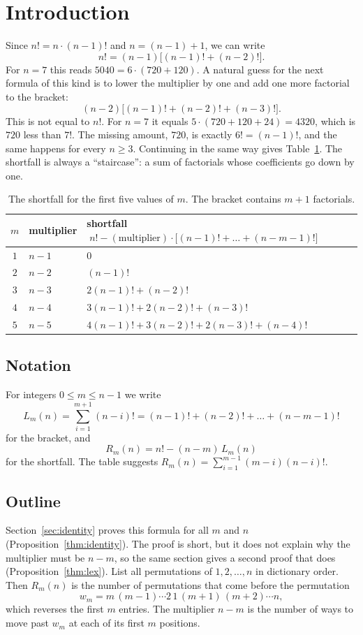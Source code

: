 \documentclass[11pt]{amsart}
\theoremstyle{plain}
\theoremstyle{definition}
\theoremstyle{remark}
\begin{document}
\section{Introduction}\label{sec:intro}

Since $n!=n\cdot(n-1)!$ and $n=(n-1)+1$, we can write
\begin{equation}\label{eq:first}
  n!=(n-1)\bigl[(n-1)!+(n-2)!\bigr].
\end{equation}
For $n=7$ this reads $5040=6\cdot(720+120)$. A natural guess for the next
formula of this kind is to lower the multiplier by one and add one more
factorial to the bracket:
\[
  (n-2)\bigl[(n-1)!+(n-2)!+(n-3)!\bigr].
\]
This is not equal to $n!$. For $n=7$ it equals $5\cdot(720+120+24)=4320$, which
is $720$ less than $7!$. The missing amount, $720$, is exactly $6!=(n-1)!$, and
the same happens for every $n\ge3$. Continuing in the same way gives
Table~\ref{tab:staircase}. The shortfall is always a ``staircase'': a sum of
factorials whose coefficients go down by one.

\begin{table}[!ht]
\centering
\begin{tabular}{@{}cll@{}}
\toprule
$m$ & multiplier & shortfall $\;n!-(\text{multiplier})\cdot\bigl[(n-1)!+\dots+(n-m-1)!\bigr]$\\
\midrule
$1$ & $n-1$ & $0$\\
$2$ & $n-2$ & $(n-1)!$\\
$3$ & $n-3$ & $2(n-1)!+(n-2)!$\\
$4$ & $n-4$ & $3(n-1)!+2(n-2)!+(n-3)!$\\
$5$ & $n-5$ & $4(n-1)!+3(n-2)!+2(n-3)!+(n-4)!$\\
\bottomrule
\end{tabular}
\caption{The shortfall for the first five values of $m$. The bracket contains
$m+1$ factorials.}
\label{tab:staircase}
\end{table}

\subsection*{Notation}
For integers $0\le m\le n-1$ we write
\[
  L_m(n)=\sum_{i=1}^{m+1}(n-i)!=(n-1)!+(n-2)!+\dots+(n-m-1)!
\]
for the bracket, and
\[
  R_m(n)=n!-(n-m)\,L_m(n)
\]
for the shortfall. The table suggests
$R_m(n)=\sum_{i=1}^{m-1}(m-i)(n-i)!$.

\subsection*{Outline}
Section~\ref{sec:identity} proves this formula for all $m$ and $n$
(Proposition~\ref{thm:identity}). The proof is short, but it does not explain why
the multiplier must be $n-m$, so the same section gives a second proof that
does (Proposition~\ref{thm:lex}). List all permutations of
$1,2,\dots,n$ in dictionary order. Then $R_m(n)$ is the number of permutations
that come before the permutation
\[
  w_m=m\,(m-1)\cdots2\,1\,(m+1)\,(m+2)\cdots n,
\]
which reverses the first $m$ entries. The multiplier $n-m$ is the number of
ways to move past $w_m$ at each of its first $m$ positions.
\end{document}
